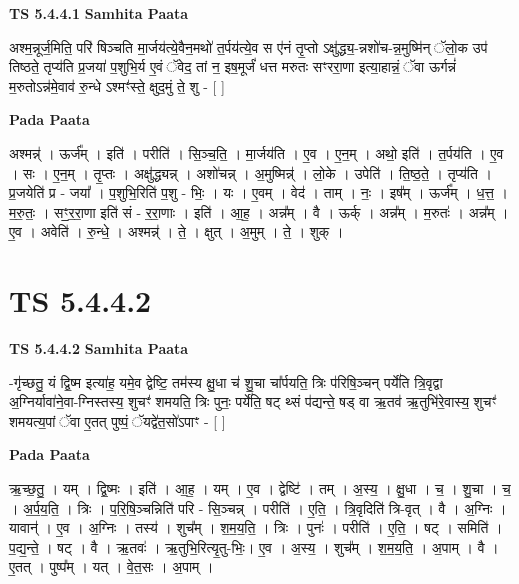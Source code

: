 \documentclass[17pt]{extarticle}
\begin{document}
\textbf{TS 5.4.4.1 } \newline
\textbf{Samhita Paata} \newline

अश्म॒न्नूर्ज॒मिति॒ परि॑ षिञ्चति मा॒र्जय॑त्ये॒वैन॒मथो॑ त॒र्पय॑त्ये॒व स ए॑नं तृ॒प्तो ऽक्षु॑द्ध्य॒-न्नशो॑च-न्न॒मुष्मि॑न् ॅलो॒क उप॑ तिष्ठते॒ तृप्य॑ति प्र॒जया॑ प॒शुभि॒र्य ए॒वं ॅवेद॒ तां न॒ इष॒मूर्जं॑ धत्त मरुतः सꣳररा॒णा इत्या॒हान्नं॒ ॅवा ऊर्गन्नं॑ म॒रुतोऽन्न॑मे॒वाव॑ रु॒न्धे ऽश्मꣳ॑स्ते॒ क्षुद॒मुं ते॒ शु - [  ] \newline

\textbf{Pada Paata} \newline

अश्मन्न्॑ । ऊर्ज᳚म् । इति॑ । परीति॑ । सि॒ञ्च॒ति॒ । मा॒र्जय॑ति । ए॒व । ए॒न॒म् । अथो॒ इति॑ । त॒र्पय॑ति । ए॒व । सः । ए॒न॒म् । तृ॒प्तः । अक्षु॑द्ध्यन्न् । अशो॑चन्न् । अ॒मुष्मिन्न्॑ । लो॒के । उपेति॑ । ति॒ष्ठ॒ते॒ । तृप्य॑ति । प्र॒जयेति॑ प्र - जया᳚ । प॒शुभि॒रिति॑ प॒शु - भिः॒ । यः । ए॒वम् । वेद॑ । ताम् । नः॒ । इष᳚म् । ऊर्ज᳚म् । ध॒त्त॒ । म॒रु॒तः॒ । सꣳ॒॒र॒रा॒णा इति॑ सं - र॒रा॒णाः । इति॑ । आ॒ह॒ । अन्न᳚म् । वै । ऊर्क् । अन्न᳚म् । म॒रुतः॑ । अन्न᳚म् । ए॒व । अवेति॑ । रु॒न्धे॒ । अश्मन्न्॑ । ते॒ । क्षुत् । अ॒मुम् । ते॒ । शुक् ।  \newline




\section*{ TS 5.4.4.2 }

\textbf{TS 5.4.4.2 } \newline
\textbf{Samhita Paata} \newline

-गृ॑च्छतु॒ यं द्वि॒ष्म इत्या॑ह॒ यमे॒व द्वेष्टि॒ तम॑स्य क्षु॒धा च॑ शु॒चा चा᳚र्पयति॒ त्रिः प॑रिषि॒ञ्चन् पर्ये॑ति त्रि॒वृद्वा अ॒ग्निर्यावा॑ने॒वा-ग्निस्तस्य॒ शुचꣳ॑ शमयति॒ त्रिः पुनः॒ पर्ये॑ति॒ षट् थ्सं प॑द्यन्ते॒ षड् वा ऋ॒तव॑ ऋ॒तुभि॑रे॒वास्य॒ शुचꣳ॑ शमयत्य॒पां ॅवा ए॒तत् पुष्पं॒ ॅयद्वे॑त॒सो॑ऽपाꣳ - [  ] \newline

\textbf{Pada Paata} \newline

ऋ॒च्छ॒तु॒ । यम् । द्वि॒ष्मः । इति॑ । आ॒ह॒ । यम् । ए॒व । द्वेष्टि॑ । तम् । अ॒स्य॒ । क्षु॒धा । च॒ । शु॒चा । च॒ । अ॒र्प॒य॒ति॒ । त्रिः । प॒रि॒षि॒ञ्चन्निति॑ परि - सि॒ञ्चन्न् । परीति॑ । ए॒ति॒ । त्रि॒वृदिति॑ त्रि-वृत् । वै । अ॒ग्निः । यावान्॑ । ए॒व । अ॒ग्निः । तस्य॑ । शुच᳚म् । श॒म॒य॒ति॒ । त्रिः । पुनः॑ । परीति॑ । ए॒ति॒ । षट् । समिति॑ । प॒द्य॒न्ते॒ । षट् । वै । ऋ॒तवः॑ । ऋ॒तुभि॒रित्यृ॒तु-भिः॒। ए॒व । अ॒स्य॒ । शुच᳚म् । श॒म॒य॒ति॒ । अ॒पाम् । वै । ए॒तत् । पुष्प᳚म् । यत् । वे॒त॒सः । अ॒पाम् ।  \newline
\end{document}
